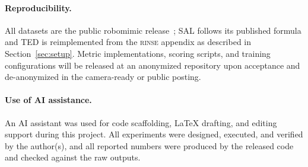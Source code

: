 \documentclass{article}
\newcommand{\rinse}{\textsc{rinse}}
\begin{document}
\paragraph{Reproducibility.} All datasets are the public robomimic
release~\citep{robomimic}; SAL follows its published formula and TED is
reimplemented from the \rinse{} appendix as described in
Section~\ref{sec:setup}. Metric implementations, scoring scripts, and
training configurations will be released at an anonymized repository upon
acceptance and de-anonymized in the camera-ready or public posting.

\paragraph{Use of AI assistance.} An AI assistant was used for code
scaffolding, LaTeX drafting, and editing support during this project. All
experiments were designed, executed, and verified by the author(s), and all
reported numbers were produced by the released code and checked against the
raw outputs.
\end{document}
